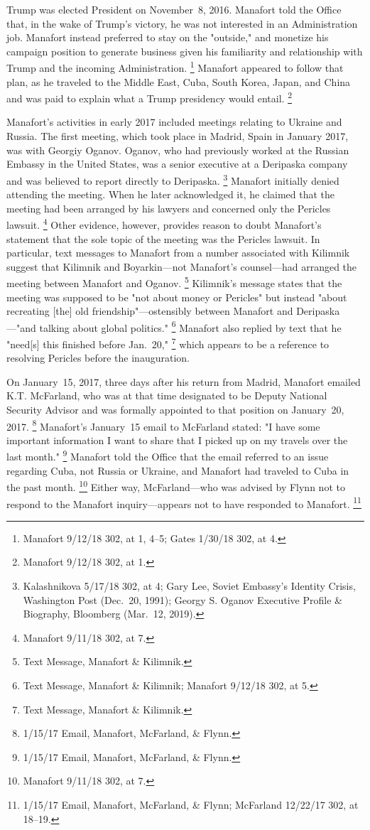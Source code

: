 Trump was elected President on November~8, 2016.
Manafort told the Office that, in the wake of Trump's victory, he was not interested in an Administration job.
Manafort instead preferred to stay on the "outside," and monetize his campaign position to generate business given his familiarity and relationship with Trump and the incoming Administration.%
\footnote{Manafort 9/12/18 302, at 1, 4--5;
Gates 1/30/18 302, at 4.}
Manafort appeared to follow that plan, as he traveled to the Middle East, Cuba, South Korea, Japan, and China and was paid to explain what a Trump presidency would entail.%
\footnote{Manafort 9/12/18 302, at 1.}

Manafort's activities in early 2017 included meetings relating to Ukraine and Russia.
The first meeting, which took place in Madrid, Spain in January 2017, was with Georgiy Oganov.
Oganov, who had previously worked at the Russian Embassy in the United States, was a senior executive at a Deripaska company and was believed to report directly to Deripaska.%
\footnote{Kalashnikova 5/17/18 302, at 4;
Gary Lee, Soviet Embassy's Identity Crisis, Washington Post (Dec.~20, 1991);
Georgy S. Oganov Executive Profile \& Biography, Bloomberg (Mar.~12, 2019).}
Manafort initially denied attending the meeting.
When he later acknowledged it, he claimed that the meeting had been arranged by his lawyers and concerned only the Pericles lawsuit.%
\footnote{Manafort 9/11/18 302, at 7.}
Other evidence, however, provides reason to doubt Manafort's statement that the sole topic of the meeting was the Pericles lawsuit.
In particular, text messages to Manafort from a number associated with Kilimnik suggest that Kilimnik and Boyarkin---not Manafort's counsel---had arranged the meeting between Manafort and Oganov.%
\footnote{Text Message, Manafort \& Kilimnik.}
Kilimnik's message states that the meeting was supposed to be "not about money or Pericles" but instead "about recreating [the] old friendship"---ostensibly between Manafort and Deripaska---"and talking about global politics."%
\footnote{Text Message, Manafort \& Kilimnik;
Manafort 9/12/18 302, at 5.}
Manafort also replied by text that he "need[s] this finished before Jan.~20,"%
\footnote{Text Message, Manafort \& Kilimnik.}
which appears to be a reference to resolving Pericles before the inauguration.

On January~15, 2017, three days after his return from Madrid, Manafort emailed K.T. McFarland, who was at that time designated to be Deputy National Security Advisor and was formally appointed to that position on January~20, 2017.%
\footnote{1/15/17 Email, Manafort, McFarland, \& Flynn.}
Manafort's January~15 email to McFarland stated: "I have some important information I want to share that I picked up on my travels over the last month."%
\footnote{1/15/17 Email, Manafort, McFarland, \& Flynn.}
Manafort told the Office that the email referred to an issue regarding Cuba, not Russia or Ukraine, and Manafort had traveled to Cuba in the past month.%
\footnote{Manafort 9/11/18 302, at 7.}
Either way, McFarland---who was advised by Flynn not to respond to the Manafort inquiry---appears not to have responded to Manafort.%
\footnote{1/15/17 Email, Manafort, McFarland, \& Flynn;
McFarland 12/22/17 302, at 18--19.}

